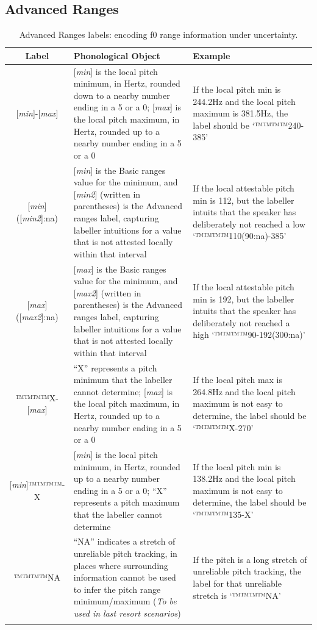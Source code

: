 \documentclass[11pt, twoside]{memoir}
\begin{document}
\subsection*{Advanced Ranges}
\begin{longtable}{cp{.46\linewidth}p{.32\linewidth}} \toprule \textbf{Label} & \textbf{Phonological Object} & \textbf{Example}\tabularnewline
\midrule \endhead
\rowcolor{green}
{[\textit{min}]-[\textit{max}]} &
	{[\textit{min}] is the local pitch minimum, in Hertz, rounded down to a nearby number ending in a 5 or a 0}; {[\textit{max}] is the local pitch maximum, in Hertz, rounded up to a nearby number ending in a 5 or a 0} &
	If the local pitch min is 244.2Hz and the local pitch maximum is 381.5Hz, the label should be ‘™™™™{240-385}’
	\tabularnewline
{[\textit{min}]([\textit{min2}]:na)} &
	[\textit{min}] is the Basic ranges value for the minimum, and [\textit{min2}] (written in parentheses) is the Advanced ranges label, capturing labeller intuitions for a value that is not attested locally within that interval &
	If the local attestable pitch min is 112, but the labeller intuits that the speaker has deliberately not reached a low ‘™™™™{110(90:na)-385}’
	\tabularnewline
{[\textit{max}]([\textit{max2}]:na)} &
	[\textit{max}] is the Basic ranges value for the minimum, and [\textit{max2}] (written in parentheses) is the Advanced ranges label, capturing labeller intuitions for a value that is not attested locally within that interval &
	If the local attestable pitch min is 192, but the labeller intuits that the speaker has deliberately not reached a high ‘™™™™{90-192(300:na)}’
	\tabularnewline
{™™™™{X-}[\textit{max}]} &
	{“X” represents a pitch minimum that the labeller cannot determine}; {[\textit{max}] is the local pitch maximum, in Hertz, rounded up to a nearby number ending in a 5 or a 0}	 &
	If the local pitch max is 264.8Hz and the local pitch maximum is not easy to determine, the label should be ‘™™™™{X-270}’
	\tabularnewline
{[\textit{min}]™™™™{-X}} &
	{[\textit{min}] is the local pitch minimum, in Hertz, rounded up to a nearby number ending in a 5 or a 0}; {“X” represents a pitch maximum that the labeller cannot determine}	 &
	If the local pitch min is 138.2Hz and the local pitch maximum is not easy to determine, the label should be ‘™™™™{135-X}’
	\tabularnewline
™™™™{NA} &
	“NA” indicates a stretch of unreliable pitch tracking, in places where surrounding information cannot be used to infer the pitch range minimum\slash maximum (\textit{To be used in last resort scenarios}) &
	If the pitch is a long stretch of unreliable pitch tracking, the label for that unreliable stretch is ‘™™™™{NA}’
	\tabularnewline
\bottomrule 
\caption{Advanced Ranges labels: encoding f0 range information under uncertainty.}
\end{longtable}
\end{document}
